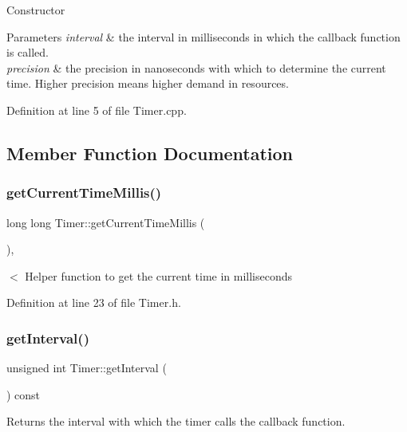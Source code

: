 Constructor 
\begin{DoxyParams}{Parameters}
{\em interval} & the interval in milliseconds in which the callback function is called. \\
\hline
{\em precision} & the precision in nanoseconds with which to determine the current time. Higher precision means higher demand in resources. \\
\hline
\end{DoxyParams}


Definition at line 5 of file Timer.\+cpp.



\subsection{Member Function Documentation}
\mbox{\label{class_timer_a39a332f8ce3a45ed8d78c772755342c8}} 
\subsubsection{\texorpdfstring{get\+Current\+Time\+Millis()}{getCurrentTimeMillis()}}
{\footnotesize\ttfamily long long Timer\+::get\+Current\+Time\+Millis (\begin{DoxyParamCaption}{ }\end{DoxyParamCaption})\hspace{0.3cm}{\ttfamily [inline]}, {\ttfamily [private]}}

$<$ Helper function to get the current time in milliseconds 

Definition at line 23 of file Timer.\+h.

\mbox{\label{class_timer_a6cbb88b5073d95fd871a012966005618}} 
\subsubsection{\texorpdfstring{get\+Interval()}{getInterval()}}
{\footnotesize\ttfamily unsigned int Timer\+::get\+Interval (\begin{DoxyParamCaption}{ }\end{DoxyParamCaption}) const}

\begin{DoxyReturn}{Returns}
the interval with which the timer calls the callback function. 
\end{DoxyReturn}


